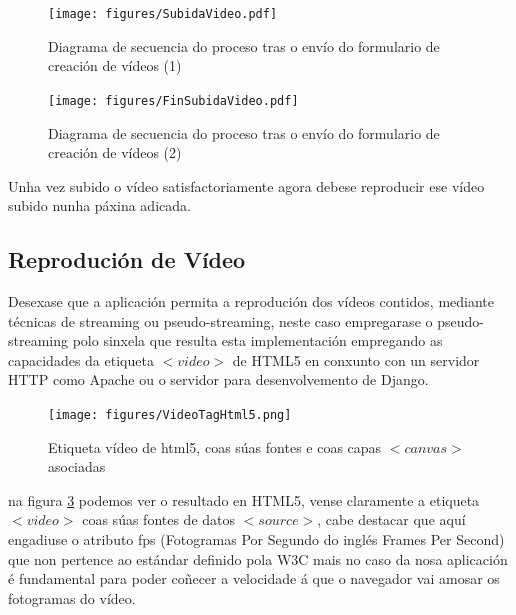         \begin{figure}[htp]
        \begin{center}
            \texttt{[image: figures/SubidaVideo.pdf]}
            \caption{Diagrama de secuencia do proceso tras o envío do formulario 
            de creación de vídeos (1)}
        \label{fig:SubidaVideo1}
        \end{center}
        \end{figure}
        
        \begin{figure}[htp]
        \begin{center}
            \texttt{[image: figures/FinSubidaVideo.pdf]}
            \caption{Diagrama de secuencia do proceso tras o envío do formulario 
            de creación de vídeos (2)}
        \label{fig:FinSubidaVideo}
        \end{center}
        \end{figure}
                
        
        Unha vez subido o vídeo satisfactoriamente agora debese reproducir ese vídeo subido nunha 
        páxina adicada.
            
    \subsection{Reprodución de Vídeo}
        Desexase que a aplicación permita a reprodución dos vídeos contidos, mediante técnicas de
        streaming ou pseudo-streaming, neste caso empregarase o pseudo-streaming polo sinxela que
        resulta esta implementación empregando as capacidades da etiqueta $<video>$ de HTML5 en conxunto
        con un servidor HTTP como Apache ou o servidor para desenvolvemento de Django.

        \begin{figure}[htp]
        \begin{center}
            \texttt{[image: figures/VideoTagHtml5.png]}
            \caption{Etiqueta vídeo de html5, coas súas fontes e coas capas $<canvas>$ asociadas}
        \label{fig:VideoTagHtml5}
        \end{center}
        \end{figure}
        
        na figura \ref{fig:VideoTagHtml5} podemos ver o resultado en HTML5, vense claramente a etiqueta
        $<video>$ coas súas fontes de datos $<source>$, cabe destacar que aquí engadiuse o atributo fps
        (Fotogramas Por Segundo do inglés Frames Per Second) que non pertence ao estándar definido pola 
        W3C\cite{w3schools-source-tag} mais no caso da nosa aplicación é fundamental para poder coñecer 
        a velocidade á que o navegador vai amosar os fotogramas do vídeo.\\
        
